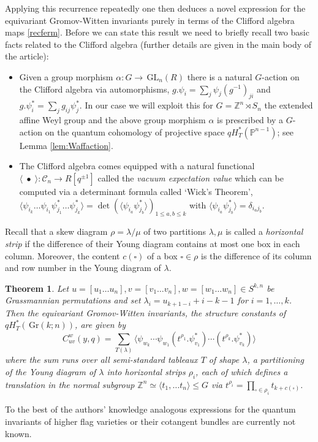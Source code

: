 \documentclass[12pt]{amsart}
\newcommand{\Z}{\mathbb{Z}}
\newcommand{\GL}{\,\mathrm{GL}}
\newcommand{\Gr}{\,\mathrm{Gr}}
\newcommand{\mb}[1]{\mathbb{#1}}
\newcommand{\mc}[1]{\mathcal{#1}}
\newcommand{\ring}{R}
\newtheorem{thm}{Theorem}[section]
\numberwithin{equation}{section}
\numberwithin{figure}{section}
\begin{document}
Applying this recurrence repeatedly one then deduces a novel expression for the equivariant Gromov-Witten invariants purely in terms of the Clifford algebra maps \eqref{recferm}. Before we can state this result we need to briefly recall two basic facts related to the Clifford algebra (further details are given in the main body of the article):
\begin{itemize}
\item[(i)] Given a group morphism $\alpha:G\to\GL_n(\ring)$ there is a natural $G$-action on the Clifford algebra via automorphisms, $g.\psi_i=\sum_{j}\psi_j (g^{-1})_{ji}$ and $g.\psi^*_i=\sum_{j}g_{ij}\psi^*_j$. In our case we will exploit this for $G=\Z^n\rtimes S_n$ the extended affine Weyl group and the above group morphism $\alpha$ is prescribed by a $G$-action on the quantum cohomology of projective space $qH^*_T(\mb{P}^{n-1})$; see Lemma \ref{lem:Waffaction}.
\item[(ii)] The Clifford algebra comes equipped with a natural functional $\langle\;\bullet\;\rangle:\mc{C}_n\to\ring[q^{\pm 1}]$ called the {\em vacuum expectation value} which can be computed via a determinant formula called `Wick's Theorem',
$\langle \psi_{i_k}\ldots\psi_{i_1}\psi^*_{j_1}\ldots\psi^*_{j_k}\rangle=\det(\langle\psi_{i_a}\psi^*_{j_b}\rangle)_{1\le a,b\le k}$ with $\langle\psi_{i_a}\psi^*_{j_b}\rangle=\delta_{i_aj_b}$. 
\end{itemize}
Recall that a skew diagram $\rho=\lambda/\mu$ of two partitions $\lambda,\mu$ is called a {\em horizontal strip} if the difference of their Young diagram contains at most one box in each column. Moreover, the content $c(\square)$ of a box $\square\in\rho$ is the difference of its column and row number in the Young diagram of $\lambda$. 
\begin{thm}
    Let $u=[u_1\ldots u_n],v=[v_1\ldots v_n],w=[w_1\ldots w_n]\in S^{k,n}$ be Grassmannian permutations and set $\lambda_i=u_{k+1-i}+i-k-1$ for $i=1,\ldots,k$. Then the equivariant Gromov-Witten invariants, the structure constants of $qH^*_T(\Gr(k;n))$, are given by 
\begin{equation}\label{intro:EGW=VEV}
C_{uv}^{w}(y,q)=\sum_{T(\lambda)}
\langle\psi_{w_k}\cdots\psi_{w_1}(t^{\rho_1}.\psi^{*}_{v_1}) \cdots(t^{\rho_k}.\psi^*_{v_k})\rangle
\end{equation}
where the sum runs over all semi-standard tableaux $T$ of shape $\lambda$, a partitioning of the Young diagram of $\lambda$ into horizontal strips $\rho_i$, each of which defines a translation in the normal subgroup $\Z^n\simeq\langle t_1,\ldots t_n\rangle\le G$ via  $t^{\rho_i}=\prod_{\square\in\rho_i}t_{k+c(\square)}$.   
\end{thm}
To the best of the authors' knowledge analogous expressions for the quantum invariants of higher flag varieties or their cotangent bundles are currently not known.
\end{document}
